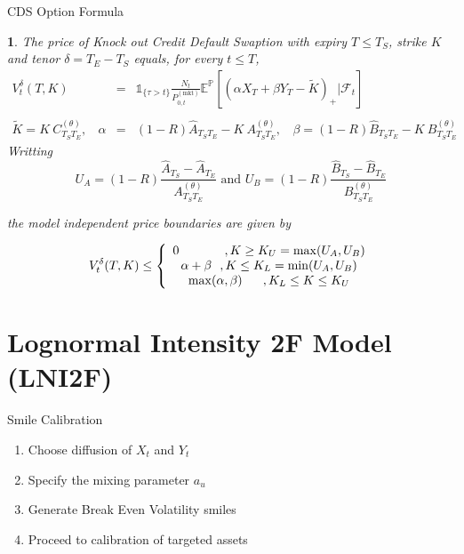 \documentclass[serif]{beamer}
\newtheorem{proposition}[theorem]{\translate{Proposition}}
\newcommand\EE {\mathbb{E}}
\newcommand\PP {\mathbb{P}}
\newcommand\F {\mathcal{F}}
\numberwithin{equation}{section}
\begin{document}
\begin{frame}{CDS Option Formula}

\begin{proposition}
\small{
\emph{
The price of Knock out Credit Default Swaption with expiry $T \leq T_S$, strike $K$ and tenor $\delta =  T_E-T_S$ equals, for every $t \leq T$,
\begin{eqnarray*} \label{eq::CDSknockOutFormula}
V_t^{\delta}(T,K) &=&{\mathds{1}_{\{ \tau > t\}}}\frac{N_t}{ P^{(\mathrm{mkt})}_{0,t}}\EE^\PP\left[\left( \alpha X_{T} + \beta Y_{T}- \tilde K\right)_+\Big| \F_t\right]\\\\
\tilde K = K~C^{(\theta)}_{T_ST_E}, ~~~~ \alpha  &=&  (1-R) \hat A_{T_ST_E} - K~A^{(\theta)}_{T_ST_E},~~~~  \beta    =  (1-R) \hat B_{T_ST_E} - K~B^{(\theta)}_{T_ST_E}
\end{eqnarray*}
}
 Writting
\begin{equation} \label{eq::CDSknockOutFormula}
U_A = (1-R)\frac{ \hat A_{T_S}-\hat A_{T_E}}{A^{(\theta)}_{T_ST_E}} \text{ \ \ and \ \ } U_B = (1-R)\frac{ \hat B_{T_S}-\hat B_{T_E}}{B^{(\theta)}_{T_ST_E}}
\end{equation}

 the model independent price boundaries are given by

\begin{equation*}
V_t^{\delta}(T,K) \leq \left\{
\begin{array}{c}
0 \text{ \ \ \ \ \ \ \ \ \ \ }, K \geq K_U = \max(U_A, U_B)\\
\alpha + \beta \text{  \
}, K \leq K_L = \min(U_A, U_B)
\\
\max(\alpha, \beta)\text{ \ \ \ \ }, K_L \leq K \leq K_U
\end{array}%
\right.
\end{equation*}
 }
\end{proposition}


\end{frame}

\section{Lognormal Intensity 2F Model (LNI2F) }

\begin{frame}{Smile Calibration}

 \begin{enumerate}
 \item<1->  Choose diffusion of $X_t$ and $Y_t$
 \item<2->  Specify the mixing parameter $a_u$
 \item<3->  Generate Break Even Volatility smiles 
 \item<4->  Proceed to calibration of targeted assets
\end{enumerate}

\end{frame}
\end{document}
